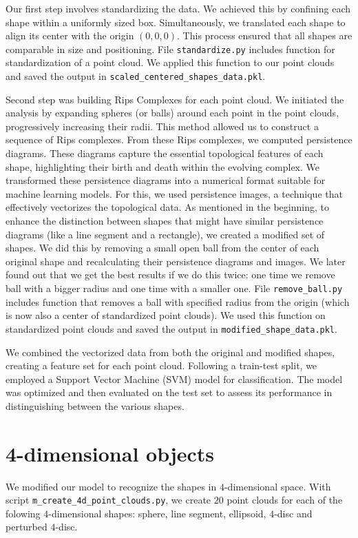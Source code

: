 \documentclass{article}
\begin{document}


Our first step involves standardizing the data. We achieved this by confining each shape within a uniformly sized box. 
Simultaneously, we translated each shape to align its center with the origin $(0,0,0)$. 
This process ensured that all shapes are comparable in size and positioning.
File \verb|standardize.py| includes function for standardization of a point cloud. 
We applied this function to our point clouds and saved the output in \verb|scaled_centered_shapes_data.pkl|.


Second step was building Rips Complexes for each point cloud. We initiated the analysis by expanding spheres (or balls) around each point in the point clouds, 
progressively increasing their radii. This method allowed us to construct a sequence of Rips complexes.
From these Rips complexes, we computed persistence diagrams. These diagrams capture the essential topological features of each shape, 
highlighting their birth and death within the evolving complex.
We transformed these persistence diagrams into a numerical format suitable for machine learning models. For this, we used persistence images, a technique that 
effectively vectorizes the topological data.
As mentioned in the beginning, to enhance the distinction between shapes that might have similar persistence diagrams (like a line segment and a rectangle), 
we created a modified set of shapes. 
We did this by removing a small open ball from the center of each original shape and recalculating their persistence diagrams and images.
We later found out that we get the best results if we do this twice: one time we remove ball with a bigger radius and one time  with a smaller one.
File \verb|remove_ball.py| includes function that removes a ball with specified radius from the origin 
(which is now also a center of standardized point clouds). 
We used this function on standardized point clouds and saved the output in \verb|modified_shape_data.pkl|.


We combined the vectorized data from both the original and modified shapes, creating a feature set for each point cloud.
Following a train-test split, we employed a Support Vector Machine (SVM) model for classification. 
The model was optimized and then evaluated on the test set to assess its performance in distinguishing between the various shapes.


\section{4-dimensional objects}
We modified our model to recognize the shapes in $4$-dimensional space.
With script \verb|m_create_4d_point_clouds.py|, we create $20$ 
point clouds for each of the folowing $4$-dimensional shapes: 
sphere, line segment, ellipsoid, $4$-disc and perturbed $4$-disc.
\end{document}
